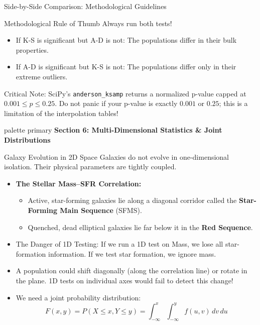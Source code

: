 \documentclass[9pt]{beamer}
\begin{document}
\begin{frame}{Side-by-Side Comparison: Methodological Guidelines}
  \begin{alertblock}{Methodological Rule of Thumb}
    Always run both tests!
    \begin{itemize}
      \item If K-S is significant but A-D is not: The populations differ in their bulk properties.
      \item If A-D is significant but K-S is not: The populations differ only in their extreme outliers.
    \end{itemize}
    \alert{Critical Note:} SciPy's \texttt{anderson\_ksamp} returns a normalized p-value capped at $0.001 \le p \le 0.25$. Do not panic if your p-value is exactly $0.001$ or $0.25$; this is a limitation of the interpolation tables!
  \end{alertblock}
\end{frame}

\begin{frame}[plain]
  \vfill
  \centering
  \begin{beamercolorbox}[sep=8pt,center,shadow=true,rounded=true]{palette primary}
    \textbf{Section 6: Multi-Dimensional Statistics \& Joint Distributions}
  \end{beamercolorbox}
  \vfill
\end{frame}

\begin{frame}{Galaxy Evolution in 2D Space}
  Galaxies do not evolve in one-dimensional isolation. Their physical parameters are tightly coupled.
  \begin{itemize}
    \item \textbf{The Stellar Mass--SFR Correlation:}
      \begin{itemize}
        \item Active, star-forming galaxies lie along a diagonal corridor called the \textbf{Star-Forming Main Sequence} (SFMS).
        \item Quenched, dead elliptical galaxies lie far below it in the \textbf{Red Sequence}.
      \end{itemize}
    \item \alert{The Danger of 1D Testing:}
      If we run a 1D test on Mass, we lose all star-formation information. If we test star formation, we ignore mass.
    \item A population could shift diagonally (along the correlation line) or rotate in the plane. 1D tests on individual axes would fail to detect this change!
    \item We need a joint probability distribution:
      $$F(x, y) = P(X \le x, Y \le y) = \int_{-\infty}^{x} \int_{-\infty}^{y} f(u, v) \, dv \, du$$
  \end{itemize}
\end{frame}
\end{document}
